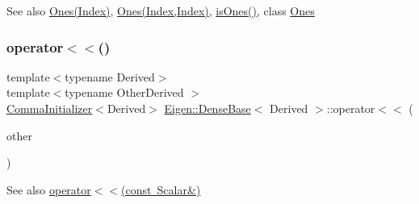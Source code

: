 \begin{DoxySeeAlso}{See also}
\mbox{\hyperlink{class_eigen_1_1_dense_base_aef6ca489dc447631fe874c8071ee7edd}{Ones(\+Index)}}, \mbox{\hyperlink{class_eigen_1_1_dense_base_adb1ce2c904a1eb3f3bab81ced1b916b6}{Ones(\+Index,\+Index)}}, \mbox{\hyperlink{class_eigen_1_1_dense_base_a91fb1c80e1fd4970a16fd509764225d7}{is\+Ones()}}, class \mbox{\hyperlink{class_eigen_1_1_dense_base_adb1ce2c904a1eb3f3bab81ced1b916b6}{Ones}} 
\end{DoxySeeAlso}
\mbox{\label{class_eigen_1_1_dense_base_a1ba2dba4aac437dc80501e2adfd16103}} 
\subsubsection{\texorpdfstring{operator$<$$<$()}{operator<<()}\hspace{0.1cm}{\footnotesize\ttfamily [1/2]}}
{\footnotesize\ttfamily template$<$typename Derived$>$ \\
template$<$typename Other\+Derived $>$ \\
\mbox{\hyperlink{struct_eigen_1_1_comma_initializer}{Comma\+Initializer}}$<$Derived$>$ \mbox{\hyperlink{class_eigen_1_1_dense_base}{Eigen\+::\+Dense\+Base}}$<$ Derived $>$\+::operator$<$$<$ (\begin{DoxyParamCaption}\item[{const \mbox{\hyperlink{class_eigen_1_1_dense_base}{Dense\+Base}}$<$ Other\+Derived $>$ \&}]{other }\end{DoxyParamCaption})\hspace{0.3cm}{\ttfamily [inline]}}

\begin{DoxySeeAlso}{See also}
\mbox{\hyperlink{class_eigen_1_1_dense_base_a0e575eb0ba6cc6bc5f347872abd8509d}{operator$<$$<$(const Scalar\&)}} 
\end{DoxySeeAlso}
\mbox{\label{class_eigen_1_1_dense_base_a0e575eb0ba6cc6bc5f347872abd8509d}} 
